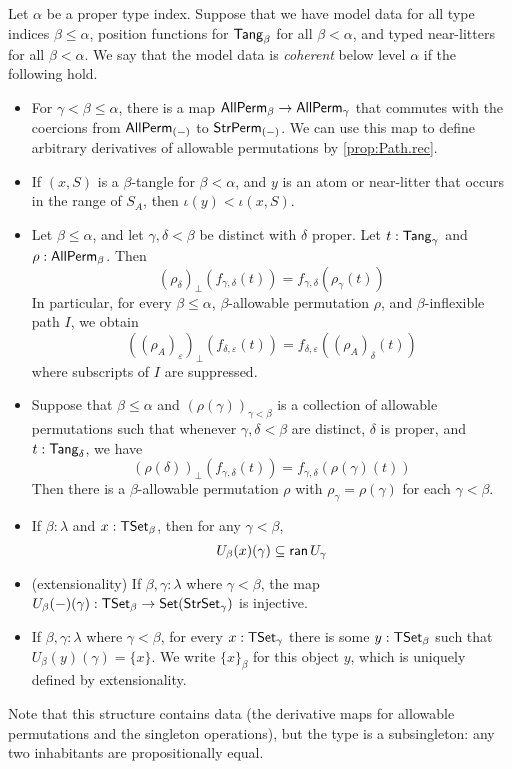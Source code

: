 \begin{definition}
  \label{def:CoherentData}
  Let \( \alpha \) be a proper type index.
  Suppose that we have model data for all type indices \( \beta \leq \alpha \), position functions for \( \mathsf{Tang}_\beta \) for all \( \beta < \alpha \), and typed near-litters for all \( \beta < \alpha \).
  We say that the model data is \emph{coherent} below level \( \alpha \) if the following hold.
  \begin{itemize}
    \item For \( \gamma < \beta \leq \alpha \), there is a map \( \mathsf{AllPerm}_\beta \to \mathsf{AllPerm}_\gamma \) that commutes with the coercions from \( \mathsf{AllPerm}_{(-)} \) to \( \mathsf{StrPerm}_{(-)} \).
    We can use this map to define arbitrary derivatives of allowable permutations by \cref{prop:Path.rec}.
    \item If \( (x, S) \) is a \( \beta \)-tangle for \( \beta < \alpha \), and \( y \) is an atom or near-litter that occurs in the range of \( S_A \), then \( \iota(y) < \iota(x, S) \).
    \item Let \( \beta \leq \alpha \), and let \( \gamma, \delta < \beta \) be distinct with \( \delta \) proper.
    Let \( t : \mathsf{Tang}_\gamma \) and \( \rho : \mathsf{AllPerm}_\beta \).
    Then
    \[ (\rho_\delta)_\bot(f_{\gamma,\delta}(t)) = f_{\gamma,\delta}(\rho_\gamma(t)) \]
    In particular, for every \( \beta \leq \alpha \), \( \beta \)-allowable permutation \( \rho \), and \( \beta \)-inflexible path \( I \), we obtain
    \[ ((\rho_A)_\varepsilon)_\bot(f_{\delta,\varepsilon}(t)) = f_{\delta,\varepsilon}((\rho_A)_\delta(t)) \]
    where subscripts of \( I \) are suppressed.
    \item Suppose that \( \beta \leq \alpha \) and \( (\rho(\gamma))_{\gamma < \beta} \) is a collection of allowable permutations such that whenever \( \gamma, \delta < \beta \) are distinct, \( \delta \) is proper, and \( t : \mathsf{Tang}_\delta \), we have
    \[ (\rho(\delta))_\bot(f_{\gamma,\delta}(t)) = f_{\gamma,\delta}(\rho(\gamma)(t)) \]
    Then there is a \( \beta \)-allowable permutation \( \rho \) with \( \rho_\gamma = \rho(\gamma) \) for each \( \gamma < \beta \).
    \item If \( \beta : \lambda \) and \( x : \mathsf{TSet}_\beta \), then for any \( \gamma < \beta \),
    \[ U_\beta(x)(\gamma) \subseteq \operatorname{\mathsf{ran}} U_\gamma \]
    \item (extensionality) If \( \beta, \gamma : \lambda \) where \( \gamma < \beta \), the map \( U_\beta(-)(\gamma) : \mathsf{TSet}_\beta \to \operatorname{\mathsf{Set}} (\mathsf{StrSet}_\gamma) \) is injective.
    \item If \( \beta, \gamma : \lambda \) where \( \gamma < \beta \), for every \( x : \mathsf{TSet}_\gamma \) there is some \( y : \mathsf{TSet}_\beta \) such that \( U_\beta(y)(\gamma) = \{ x \} \).
    We write \( \{ x \}_\beta \) for this object \( y \), which is uniquely defined by extensionality.
  \end{itemize}
  Note that this structure contains data (the derivative maps for allowable permutations and the singleton operations), but the type is a subsingleton: any two inhabitants are propositionally equal.
\end{definition}
